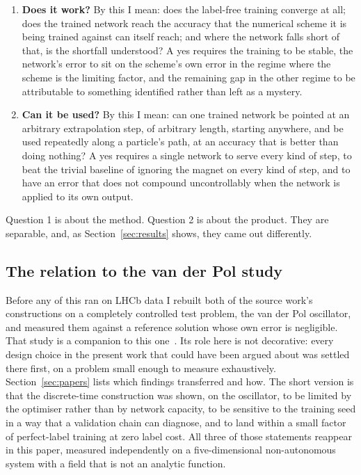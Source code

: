 \documentclass[11pt,a4paper]{article}
\begin{document}
\begin{enumerate}
  \item \textbf{Does it work?} By this I mean: does the label-free training
  converge at all; does the trained network reach the accuracy that the
  numerical scheme it is being trained against can itself reach; and where the
  network falls short of that, is the shortfall understood? A yes requires the
  training to be stable, the network's error to sit on the scheme's own error in
  the regime where the scheme is the limiting factor, and the remaining gap in
  the other regime to be attributable to something identified rather than left
  as a mystery.

  \item \textbf{Can it be used?} By this I mean: can one trained network be
  pointed at an arbitrary extrapolation step, of arbitrary length, starting
  anywhere, and be used repeatedly along a particle's path, at an accuracy that
  is better than doing nothing? A yes requires a single network to serve every
  kind of step, to beat the trivial baseline of ignoring the magnet on every
  kind of step, and to have an error that does not compound uncontrollably when
  the network is applied to its own output.
\end{enumerate}

Question 1 is about the method. Question 2 is about the product. They are
separable, and, as Section~\ref{sec:results} shows, they came out differently.

\subsection{The relation to the van der Pol study}

Before any of this ran on LHCb data I rebuilt both of the source work's
constructions on a completely controlled test problem, the van der Pol
oscillator, and measured them against a reference solution whose own error is
negligible. That study is a companion to this one~\cite{scriven2026vdp}. Its
role here is not decorative: every design choice in the present work that could
have been argued about was settled there first, on a problem small enough to
measure exhaustively. Section~\ref{sec:papers} lists which findings transferred
and how. The short version is that the discrete-time construction was shown, on
the oscillator, to be limited by the optimiser rather than by network capacity,
to be sensitive to the training seed in a way that a validation chain can
diagnose, and to land within a small factor of perfect-label training at zero
label cost. All three of those statements reappear in this paper, measured
independently on a five-dimensional non-autonomous system with a field that is
not an analytic function.
\end{document}
